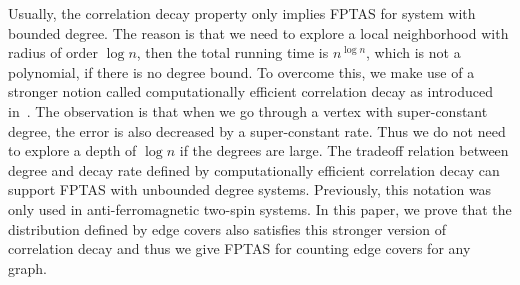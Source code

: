 Usually, the correlation decay property only implies FPTAS for system with bounded degree. The reason is that
we need to explore a local neighborhood with radius of order $\log n$, then the total running time is $n^{\log n}$, which is not a polynomial, if there is no degree bound. To overcome this, we make use of a stronger notion called computationally efficient correlation decay
as introduced in~\cite{LLY12}. The observation is that when we go through a vertex with super-constant degree, the error is also decreased by a super-constant rate. Thus we do not need to explore a depth of $\log n$ if the degrees are large. The tradeoff relation between degree and decay rate defined by  computationally efficient correlation decay can support FPTAS with unbounded degree systems. Previously, this notation was only used in anti-ferromagnetic two-spin systems. In this paper, we prove that the distribution defined by edge covers also satisfies this stronger version of correlation decay and thus we give FPTAS for counting edge covers for any graph.
